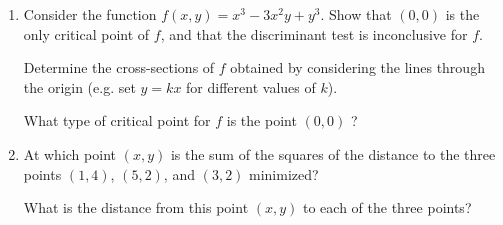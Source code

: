 \documentclass[12pt]{article}
\begin{document}
\begin{enumerate}
\item Consider the function $f(x,y)=x^3-3x^2y+y^3$.
  Show that $(0,0)$ is the only critical point of $f$, and that the discriminant test is inconclusive for $f$.

  Determine the cross-sections of $f$ obtained by considering the lines through the origin (e.g. set $y=kx$ for different values of $k$).

  What type of critical point for $f$ is the point $(0,0)$ ?
\vspace{-2pt}

\item At which point $(x,y)$ is the sum of the squares of the distance to the three points $(1,4)$, $(5,2)$, and $(3,2)$ minimized?

  What is the distance from this point $(x,y)$ to each of the three points?
\vspace{-2pt}

\end{enumerate}
\end{document}
